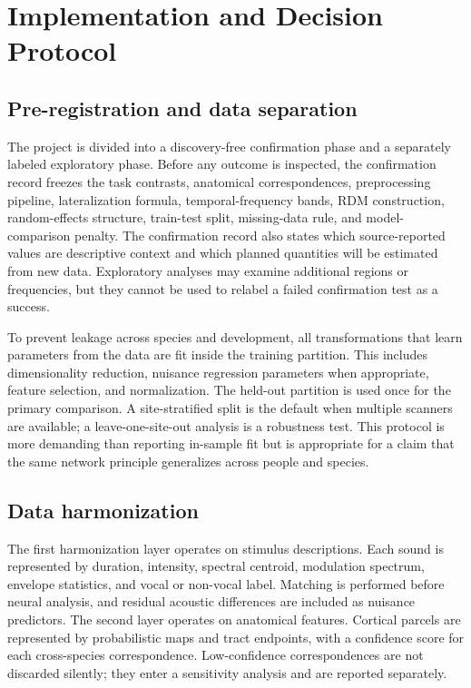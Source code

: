 \documentclass[conference]{IEEEtran}
\begin{document}
\section{Implementation and Decision Protocol}

\subsection{Pre-registration and data separation}

The project is divided into a discovery-free confirmation phase and a separately labeled exploratory phase. Before any outcome is inspected, the confirmation record freezes the task contrasts, anatomical correspondences, preprocessing pipeline, lateralization formula, temporal-frequency bands, RDM construction, random-effects structure, train-test split, missing-data rule, and model-comparison penalty. The confirmation record also states which source-reported values are descriptive context and which planned quantities will be estimated from new data. Exploratory analyses may examine additional regions or frequencies, but they cannot be used to relabel a failed confirmation test as a success.

To prevent leakage across species and development, all transformations that learn parameters from the data are fit inside the training partition. This includes dimensionality reduction, nuisance regression parameters when appropriate, feature selection, and normalization. The held-out partition is used once for the primary comparison. A site-stratified split is the default when multiple scanners are available; a leave-one-site-out analysis is a robustness test. This protocol is more demanding than reporting in-sample fit but is appropriate for a claim that the same network principle generalizes across people and species.

\subsection{Data harmonization}

The first harmonization layer operates on stimulus descriptions. Each sound is represented by duration, intensity, spectral centroid, modulation spectrum, envelope statistics, and vocal or non-vocal label. Matching is performed before neural analysis, and residual acoustic differences are included as nuisance predictors. The second layer operates on anatomical features. Cortical parcels are represented by probabilistic maps and tract endpoints, with a confidence score for each cross-species correspondence. Low-confidence correspondences are not discarded silently; they enter a sensitivity analysis and are reported separately.
\end{document}
